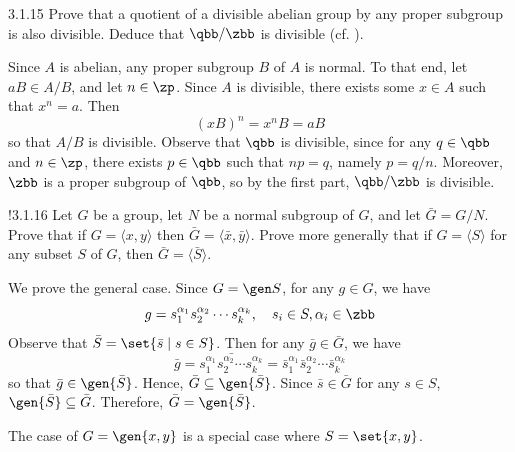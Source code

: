 \begin{exercise}{3.1.15}
    Prove that a quotient of a divisible abelian group by any proper subgroup is also divisible.
	Deduce that $\qbb/\zbb$ is divisible (cf. ).
\end{exercise}

\begin{sol}
    Since $A$ is abelian, any proper subgroup $B$ of $A$ is normal.
	To that end, let $aB \in A/B$, and let $n \in \zp$.
	Since $A$ is divisible, there exists some $x \in A$ such that $x^n = a$.
	Then
    \[
    	(xB)^n = x^n B = aB
    \]
    so that $A/B$ is divisible.
	Observe that $\qbb$ is divisible, since for any $q \in \qbb$ and $n \in \zp$, there exists $p \in \qbb$ such that $np = q$, namely $p = q/n$.
	Moreover, $\zbb$ is a proper subgroup of $\qbb$, so by the first part, $\qbb/\zbb$ is divisible.
\end{sol}

\begin{exercise}!{3.1.16}
    Let $G$ be a group, let $N$ be a normal subgroup of $G$, and let $\bar{G} = G/N$.
	Prove that if $G = \langle x, y \rangle$ then $\bar{G} = \langle \bar{x}, \bar{y} \rangle$.
	Prove more generally that if $G = \langle S \rangle$ for any subset $S$ of $G$, then $\bar{G} = \langle \bar{S} \rangle$.
\end{exercise}

\begin{sol}
    We prove the general case.
	Since $G = \gen S$, for any $g \in G$, we have
    \[
    	g = s_1^{\alpha_1} s_2^{\alpha_2} \cdots s_k^{\alpha_k}, \quad s_i \in S, \alpha_i \in \zbb
    \]
    Observe that $\bar S = \set{\bar s \mid s \in S}$.
	Then for any $\bar g \in \bar G$, we have
    \[
    	\bar g = \bar{s_1^{\alpha_1} s_2^{\alpha_2} \cdots s_k^{\alpha_k}} = \bar s_1^{\alpha_1} \bar s_2^{\alpha_2} \cdots \bar s_k^{\alpha_k}
    \]
    so that $\bar g \in \gen{\bar S}$.
	Hence, $\bar G \subseteq \gen{\bar S}$.
	Since $\bar s \in \bar G$ for any $s \in S$, $\gen{\bar S} \subseteq \bar G$.
	Therefore, $\bar G = \gen{\bar S}$.

    The case of $G = \gen{x, y}$ is a special case where $S = \set{x, y}$.
\end{sol}

